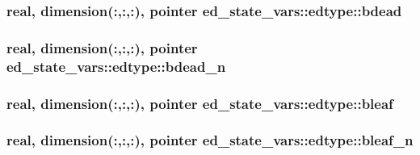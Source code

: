 \subsubsection[{\texorpdfstring{bdead}{bdead}}]{\setlength{\rightskip}{0pt plus 5cm}real, dimension(\+:,\+:,\+:), pointer ed\+\_\+state\+\_\+vars\+::edtype\+::bdead}\hypertarget{structed__state__vars_1_1edtype_ad4fcd5b227e4eee12d74af0daf132561}{}\label{structed__state__vars_1_1edtype_ad4fcd5b227e4eee12d74af0daf132561}
\subsubsection[{\texorpdfstring{bdead\+\_\+n}{bdead_n}}]{\setlength{\rightskip}{0pt plus 5cm}real, dimension(\+:,\+:,\+:), pointer ed\+\_\+state\+\_\+vars\+::edtype\+::bdead\+\_\+n}\hypertarget{structed__state__vars_1_1edtype_aea9330612f16053ec3d717a091265c0e}{}\label{structed__state__vars_1_1edtype_aea9330612f16053ec3d717a091265c0e}
\subsubsection[{\texorpdfstring{bleaf}{bleaf}}]{\setlength{\rightskip}{0pt plus 5cm}real, dimension(\+:,\+:,\+:), pointer ed\+\_\+state\+\_\+vars\+::edtype\+::bleaf}\hypertarget{structed__state__vars_1_1edtype_a3a276de064b0dc7263aefa8e728d9c95}{}\label{structed__state__vars_1_1edtype_a3a276de064b0dc7263aefa8e728d9c95}
\subsubsection[{\texorpdfstring{bleaf\+\_\+n}{bleaf_n}}]{\setlength{\rightskip}{0pt plus 5cm}real, dimension(\+:,\+:,\+:), pointer ed\+\_\+state\+\_\+vars\+::edtype\+::bleaf\+\_\+n}\hypertarget{structed__state__vars_1_1edtype_a9631e22ecc01eda46b23f3e392dcf5b9}{}\label{structed__state__vars_1_1edtype_a9631e22ecc01eda46b23f3e392dcf5b9}
